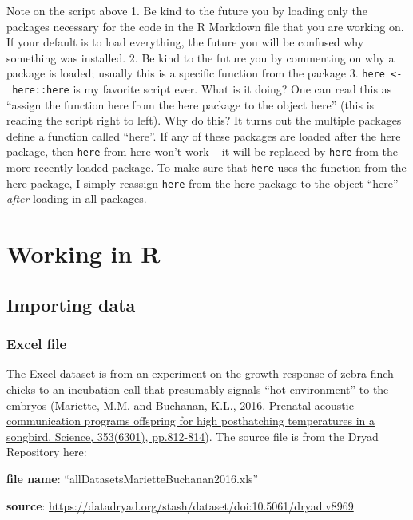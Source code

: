 \documentclass[]{book}
\begin{document}
Note on the script above
1. Be kind to the future you by loading only the packages necessary for the code in the R Markdown file that you are working on. If your default is to load everything, the future you will be confused why something was installed.
2. Be kind to the future you by commenting on why a package is loaded; usually this is a specific function from the package
3. \texttt{here\ \textless{}-\ here::here} is my favorite script ever. What is it doing? One can read this as ``assign the function here from the here package to the object here'' (this is reading the script right to left). Why do this? It turns out the multiple packages define a function called ``here''. If any of these packages are loaded after the here package, then \texttt{here} from here won't work -- it will be replaced by \texttt{here} from the more recently loaded package. To make sure that \texttt{here} uses the function from the here package, I simply reassign \texttt{here} from the here package to the object ``here'' \emph{after} loading in all packages.

\hypertarget{data-working-in-r}{%
\section{Working in R}\label{data-working-in-r}}

\hypertarget{importing-data}{%
\subsection{Importing data}\label{importing-data}}

\hypertarget{excel-file}{%
\subsubsection{Excel file}\label{excel-file}}

The Excel dataset is from an experiment on the growth response of zebra finch chicks to an incubation call that presumably signals ``hot environment'' to the embryos (\href{http://science.sciencemag.org/content/353/6301/812}{Mariette, M.M. and Buchanan, K.L., 2016. Prenatal acoustic communication programs offspring for high posthatching temperatures in a songbird. Science, 353(6301), pp.812-814}). The source file is from the Dryad Repository here:

\textbf{file name}: ``allDatasetsMarietteBuchanan2016.xls''

\textbf{source}: \url{https://datadryad.org/stash/dataset/doi:10.5061/dryad.v8969}
\end{document}
